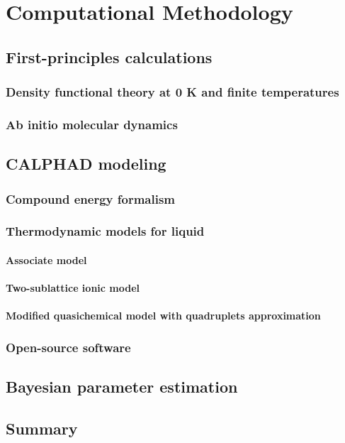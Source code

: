 \chapter{Computational Methodology} \label{chap:method}

\section{First-principles calculations} \label{method:sec:firstprinciples}

\subsection{Density functional theory at 0 K and finite temperatures} \label{method:ssec:dft}

\subsection{Ab initio molecular dynamics} \label{method:ssec:AIMD}

\section{CALPHAD modeling} \label{method:sec:calphad}

\subsection{Compound energy formalism} \label{method:ssec:CEF}

\subsection{Thermodynamic models for liquid} \label{method:ssec:liqmodels}

\subsubsection{Associate model} \label{method:sssec:assm}

\subsubsection{Two-sublattice ionic model} \label{method:sssec:ionic}

\subsubsection{Modified quasichemical model with quadruplets approximation} \label{method:ssec:mqmqa}

\subsection{Open-source software} \label{method:ssec:tools}

\section{Bayesian parameter estimation} \label{method:ssec:Bayesian}

\section{Summary} \label{method:ssec:summary}
